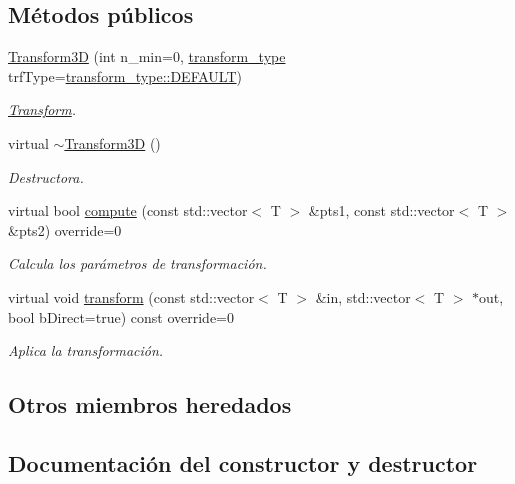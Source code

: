 \subsection*{Métodos públicos}
\begin{DoxyCompactItemize}
\item 
\hyperlink{class_i3_d_1_1_transform3_d_a12d7d96b5fe1aa5d151ac1750d2a382d}{Transform3D} (int n\+\_\+min=0, \hyperlink{group__trf_group_ga175e1580b1ecbc0710ad48060d56c2a3}{transform\+\_\+type} trf\+Type=\hyperlink{group__trf_group_gga175e1580b1ecbc0710ad48060d56c2a3a5b39c8b553c821e7cddc6da64b5bd2ee}{transform\+\_\+type\+::\+D\+E\+F\+A\+U\+LT})
\begin{DoxyCompactList}\small\item\em \hyperlink{class_i3_d_1_1_transform}{Transform}. \end{DoxyCompactList}\item 
virtual \hyperlink{class_i3_d_1_1_transform3_d_abc254b877a5a6c382a9571b14ffffa86}{$\sim$\+Transform3D} ()
\begin{DoxyCompactList}\small\item\em Destructora. \end{DoxyCompactList}\item 
virtual bool \hyperlink{class_i3_d_1_1_transform3_d_a3caf93312fc1b3b2ce9f6e88edd9316b}{compute} (const std\+::vector$<$ T $>$ \&pts1, const std\+::vector$<$ T $>$ \&pts2) override=0
\begin{DoxyCompactList}\small\item\em Calcula los parámetros de transformación. \end{DoxyCompactList}\item 
virtual void \hyperlink{class_i3_d_1_1_transform3_d_a229db14f7cd732f5d9ecf01be5ea8bf5}{transform} (const std\+::vector$<$ T $>$ \&in, std\+::vector$<$ T $>$ $\ast$out, bool b\+Direct=true) const  override=0
\begin{DoxyCompactList}\small\item\em Aplica la transformación. \end{DoxyCompactList}\end{DoxyCompactItemize}
\subsection*{Otros miembros heredados}


\subsection{Documentación del constructor y destructor}
